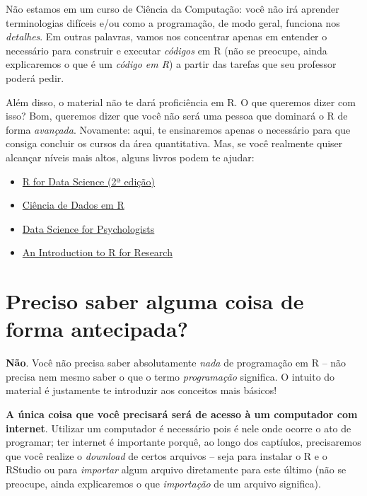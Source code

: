 \documentclass[
  letterpaper,
  DIV=11,
  numbers=noendperiod]{scrreprt}
\begin{document}

Não estamos em um curso de Ciência da Computação: você não irá aprender
terminologias difíceis e/ou como a programação, de modo geral, funciona
nos \emph{detalhes}. Em outras palavras, vamos nos concentrar apenas em
entender o necessário para construir e executar \emph{códigos} em R (não
se preocupe, ainda explicaremos o que é um \emph{código em R}) a partir
das tarefas que seu professor poderá pedir.

Além disso, o material não te dará proficiência em R. O que queremos
dizer com isso? Bom, queremos dizer que você não será uma pessoa que
dominará o R de forma \emph{avançada}. Novamente: aqui, te ensinaremos
apenas o necessário para que consiga concluir os cursos da área
quantitativa. Mas, se você realmente quiser alcançar níveis mais altos,
alguns livros podem te ajudar:

\begin{itemize}
\item
  \href{https://r4ds.hadley.nz/}{R for Data Science (2ª edição)}
\item
  \href{https://livro.curso-r.com/index.html}{Ciência de Dados em R}
\item
  \href{https://bookdown.org/hneth/ds4psy/}{Data Science for
  Psychologists}
\item
  \href{https://bookdown.org/rwnahhas/IntroToR/}{An Introduction to R
  for Research}
\end{itemize}

\section*{Preciso saber alguma coisa de forma
antecipada?}\label{preciso-saber-alguma-coisa-de-forma-antecipada}


\textbf{Não}. Você não precisa saber absolutamente \emph{nada} de
programação em R -- não precisa nem mesmo saber o que o termo
\emph{programação} significa. O intuito do material é justamente te
introduzir aos conceitos mais básicos!

\textbf{A única coisa que você precisará será de acesso à um computador
com internet}. Utilizar um computador é necessário pois é nele onde
ocorre o ato de programar; ter internet é importante porquê, ao longo
dos captíulos, precisaremos que você realize o \emph{download} de certos
arquivos -- seja para instalar o R e o RStudio ou para \emph{importar}
algum arquivo diretamente para este último (não se preocupe, ainda
explicaremos o que \emph{importação} de um arquivo significa).
\end{document}
